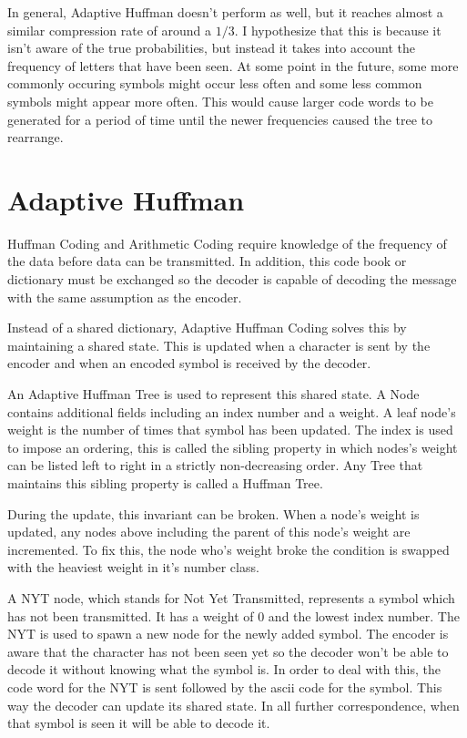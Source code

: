 \documentclass{article}
\begin{document}
In general, Adaptive Huffman doesn't perform as well, but it reaches almost a similar compression rate of around a $1/3$. I hypothesize that this is because it isn't aware of the true probabilities, but instead it takes into account the frequency of letters that have been seen. At some point in the future, some more commonly occuring symbols might occur less often and some less common symbols might appear more often. This would cause larger code words to be generated for a period of time until the newer frequencies caused the tree to rearrange.

\section{Adaptive Huffman}

Huffman Coding and Arithmetic Coding require knowledge of the frequency of the data before data can be transmitted. In addition, this code book or dictionary must be exchanged so the decoder is capable of decoding the message with the same assumption as the encoder.

Instead of a shared dictionary, Adaptive Huffman Coding solves this by maintaining a shared state. This is updated when a character is sent by the encoder and when an encoded symbol is received by the decoder.

An Adaptive Huffman Tree is used to represent this shared state. A Node contains additional fields including an index number and a weight. A leaf node's weight is the number of times that symbol has been updated. The index is used to impose an ordering, this is called the sibling property in which nodes's weight can be listed left to right in a strictly non-decreasing order. Any Tree that maintains this sibling property is called a Huffman Tree.

During the update, this invariant can be broken. When a node's weight is updated, any nodes above including the parent of this node's weight are incremented. To fix this, the node who's weight broke the condition is swapped with the heaviest weight in it's number class. 

A NYT node, which stands for Not Yet Transmitted, represents a symbol which has not been transmitted. It has a weight of 0 and the lowest index number. The NYT is used to spawn a new node for the newly added symbol. The encoder is aware that the character has not been seen yet so the decoder won't be able to decode it without knowing what the symbol is. In order to deal with this, the code word for the NYT is sent followed by the ascii code for the symbol. This way the decoder can update its shared state. In all further correspondence, when that symbol is seen it will be able to decode it.
\end{document}
